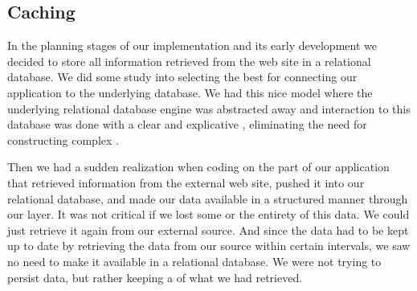 \subsection{Caching}
\label{section:implementation.architecture.caching}

In the planning stages of our implementation and its early development we
decided to store all information retrieved from the \urort{} web site
in a relational database. We did some study into selecting the best
%
for connecting our application to the underlying database. We had this nice
model where the underlying relational database engine was abstracted away
and interaction to this database was done with a clear and explicative
,%
eliminating the need for constructing complex .%

Then we had a sudden realization when coding on the part of our application
that retrieved information from the external \urort{} web site, pushed it into
our relational database, and made our data available in a structured manner
through our  layer. It was not critical if we lost some or the
entirety of this data. We could just retrieve it again from our external
source. And since the data had to be kept up to date by retrieving the data
from our source within certain intervals, we saw no need to make it available
in a relational database. We were not trying to persist data, but rather
keeping a %
of what we had retrieved.

